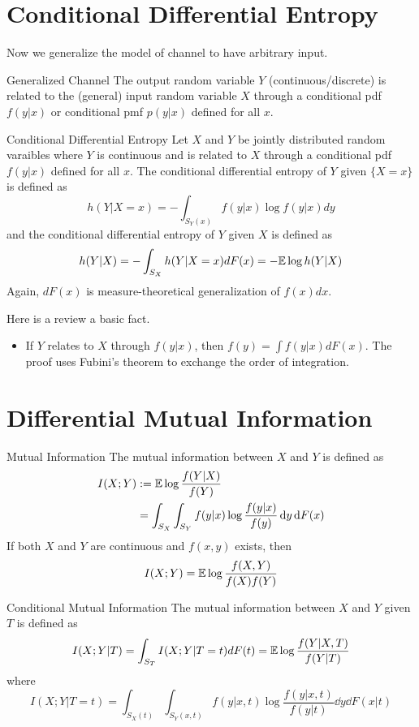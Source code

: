 \documentclass[../main.tex]{subfiles}
\begin{document}
\section{Conditional Differential Entropy}
Now we generalize the model of channel to have arbitrary input.
\begin{gbox}{Generalized Channel}
    The output random variable $Y$ (continuous/discrete) is related to the (general) input random variable $X$ through a conditional pdf $f(y|x)$ or conditional pmf $p(y|x)$ defined for all $x$.
\end{gbox}
\begin{gbox}{Conditional Differential Entropy}
    Let $X$ and $Y$ be jointly distributed random varaibles where $Y$ is continuous and is related to $X$ through a conditional pdf $f(y|x)$ defined for all $x$. The conditional differential entropy of $Y$ given $\{X=x\}$ is defined as \[
    h(Y|X=x) = -\int_{S_Y(x)}f(y|x)\log f(y|x)dy
    \] and the conditional differential entropy of $Y$ given $X$ is defined as \[
    h(Y|X) = -\int_{S_X}h(Y|X=x)dF(x) = -\mathbb{E} \log h(Y|X)
    \]
    Again, $dF(x)$ is measure-theoretical generalization of $f(x)dx$.
\end{gbox}
Here is a review a basic fact.
\begin{itemize}
    \item If $Y$ relates to $X$ through $f(y|x)$, then $f(y)=\int f(y|x)dF(x)$. The proof uses Fubini's theorem to exchange the order of integration.
\end{itemize}
\section{Differential Mutual Information}
\begin{gbox}{Mutual Information}
    The mutual information between $X$ and $Y$ is defined as \begin{align*}
    I(X;Y)&:=\mathbb{E} \log\frac{f(Y|X)}{f(Y)} \\
    &=\int_{S_X}\int_{S_Y} f(y|x)\log\frac{f(y|x)}{f(y)}\,\mathrm{d} y\,\mathrm{d} F(x)
    \end{align*}
    If both $X$ and $Y$ are continuous and $f(x,y)$ exists, then \[
    I(X;Y) = \mathbb{E} \log \frac{f(X,Y)}{f(X)f(Y)}
    \]
\end{gbox}
\begin{gbox}{Conditional Mutual Information}
    The mutual information between $X$ and $Y$ given $T$ is defined as \[
    I(X;Y|T) = \int_{S_T}I(X;Y|T=t)dF(t) = \mathbb{E}\log\frac{f(Y|X,T)}{f(Y|T)}
    \]
    where \[I(X;Y|T=t) = \int_{S_X(t)}\int_{S_Y(x,t)}f(y|x,t)\log\frac{f(y|x,t)}{f(y|t)}\dd y\dd F(x|t)
    \]
\end{gbox}
\end{document}
